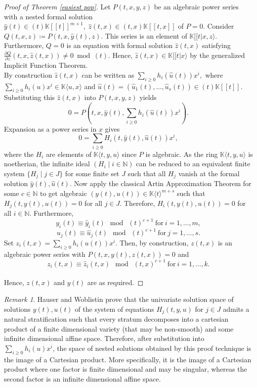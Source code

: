 \documentclass[10pt, a4paper]{article}
\def\wh{\widehat}
\theoremstyle{remark}
\newtheorem*{remark}{Remark}
\theoremstyle{remark}
\begin{document}
\begin{proof}[Proof of Theorem \ref{easiest pop}]
Let $P(t,x,y,z)$ be an algebraic power series with a nested formal solution $\wh{y}(t)\in(t)\mathbb{K}[[t]]^{m+1},\;\wh{z}(t,x)\in(t,x)\mathbb{K}[[t,x]]$ of $P=0$. Consider $Q(t,x,z)\coloneqq P(t,x,\wh{y}(t),z)$. This series is an element of $\mathbb{K}[[t\vert x,z\rangle$. Furthermore, $Q=0$ is an equation with formal solution $\wh{z}(t,x)$ satisfying $\frac{\partial Q}{\partial z}(t,x,\wh{z}(t,x))\neq0\bmod (t).$ Hence, $\widehat{z}(t,x)\in\mathbb{K}[[t\vert x\rangle$ by the generalized Implicit Function Theorem.
\\By construction $\wh{z}(t,x)$ can be written as $\sum_{i\geq 0}h_{i}(\wh{u}(t))x^i,$ where $\sum_{i\geq 0}h_{i}(u)x^i \in\mathbb{K}\langle u,x\rangle$ and $\wh{u}(t)=(\wh{u}_1(t),\ldots,\wh{u}_s(t))\in (t)\mathbb{K}[[t]]$. Substituting this $\wh{z}(t,x)$ into $P(t,x,y,z)$ yields $$0=P(t,x,\wh{y}(t),\sum_{i\geq 0}h_i(\wh{u}(t))x^i).$$ Expansion as a power series in $x$ gives $$0=\sum_{i\geq0}H_i(t,\wh{y}(t),\wh{u}(t))x^i,$$ where the $H_i$ are elements of $\mathbb{K}\langle t,y,u\rangle$ since $P$ is algebraic. 
 As the ring $\mathbb{K}\langle t,y,u\rangle$ is noetherian, the infinite ideal $( H_i \mid i\in\mathbb{N})$ can be reduced to an equivalent finite system $\{H_j\mid j\in J\}$ for some finite set $J$ such that all $H_j$ vanish at the formal solution $\wh{y}(t),\wh{u}(t)$. Now apply the classical Artin Approximation Theorem for some $c\in\mathbb{N}$ to get algebraic $(y(t),u(t))\in\mathbb{K}\langle t\rangle^{m+s}$ such that $H_j(t,y(t),u(t))=0$ for all $j\in J$. Therefore, $H_i(t,y(t),u(t))=0$ for all $i\in\mathbb{N}$. 
 Furthermore, 
 $$y_i(t)\equiv\wh{y}_i(t) \: \bmod \:(t)^{c+1}\: \mathrm{for} \: i=1,\ldots,m,$$
     $$u_j(t)\equiv\wh{u}_j(t) \: \bmod \:(t)^{c+1}\: \mathrm{for} \: j=1,\ldots,s.$$
     Set $z_i(t,x)=\sum_{i\geq 0}h_{i}(u(t))x^i$. Then, by construction, $z(t,x)$ is an algebraic power series with $P(t,x,y(t),z(t,x))=0$ and $$z_i(t,x)\equiv \wh{z}_i(t,x) \: \bmod \:(t,x)^{c+1}\: \mathrm{for} \: i=1,\ldots,k.$$
     \\Hence, $z(t,x)$ and $y(t)$ are as required.
\end{proof}
\begin{remark}
    Hauser and Woblistin \cite{Hauser_Woblistin_2021} prove that the univariate solution space of solutions $y(t),u(t)$ of the system of equations $H_j(t,y,u)$ for $j\in J$ admits a natural stratification such that every stratum decomposes into a cartesian product of a finite dimensional variety (that may be non-smooth) and some infinite dimensional affine space. Therefore, after substitution into $\sum_{i\geq 0}h_{i}(u)x^i$, the space of nested solutions obtained by this proof technique is the image of a Cartesian product. More specifically, it is the image of a Cartesian product where one factor is finite dimensional and may be singular, whereas the second factor is an infinite dimensional affine space.
\end{remark}
\end{document}
